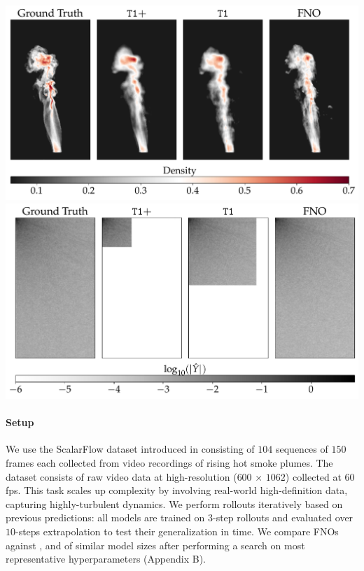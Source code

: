 \begin{minipage}[t]{\linewidth}
    \centering
    \includegraphics[width=0.49\linewidth]{figures/scalarflow_comparison_large.pdf}
    \hfill
    \includegraphics[width=0.49\linewidth]{figures/scalarflow_comparison_dct_large.pdf}
    \vspace{-3mm}
\label{fig:scalarflow-comparison-raw}
\end{minipage}

\paragraph{Setup}
We use the ScalarFlow dataset introduced in \citep{eckert2019scalarflow} consisting of $104$ sequences of $150$ frames each collected from video recordings of rising hot smoke plumes. The dataset consists of raw video data at high-resolution ($600$ × $1062$) collected at $60$ fps. This task scales up complexity by involving real-world high-definition data, capturing highly-turbulent dynamics. We perform rollouts iteratively based on previous predictions: all models are trained on $3$-step rollouts and evaluated over $10$-steps extrapolation to test their generalization in time. We compare FNOs against \ourmethod{}, \ourmethod{+} and  of similar model sizes after performing a search on most representative hyperparameters (Appendix B).

